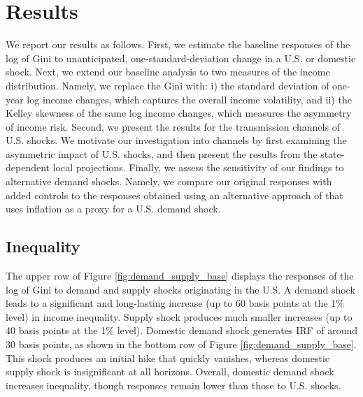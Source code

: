 \documentclass[12pt, a4paper]{article}
\begin{document}
\section{Results}
We report our results as follows. First, we estimate the baseline responses of the log of Gini to unanticipated, one-standard-deviation change in a U.S. or domestic shock. Next, we extend our baseline analysis to two measures of the income distribution. Namely, we replace the Gini with: i) the standard deviation of one-year log income changes, which captures the overall income volatility, and ii) the Kelley skewness of the same log income changes, which measures the asymmetry of income risk. Second, we present the results for the transmission channels of U.S. shocks. We motivate our investigation into channels by first examining the asymmetric impact of U.S. shocks, and then present the results from the state-dependent local projections. Finally, we assess the sensitivity of our findings to alternative demand shocks. Namely, we compare our original responses with added controls to the responses obtained using an alternative approach of \textcite{bayoumi1992shocking} that uses inflation as a proxy for a U.S. demand shock.


\subsection{Inequality}
The upper row of Figure \ref{fig:demand_supply_base} displays the responses of the log of Gini to demand and supply shocks originating in the U.S. A demand shock leads to a significant and long-lasting increase (up to 60 basis points at the 1\% level) in income inequality. Supply shock produces much smaller increases (up to 40 basis points at the 1\% level). Domestic demand shock generates IRF of around 30 basis points, as shown in the bottom row of Figure \ref{fig:demand_supply_base}. This shock produces an initial hike that quickly vanishes, whereas domestic supply shock is insignificant at all horizons. Overall, domestic demand shock increases inequality, though responses remain lower than those to U.S. shocks. 

\end{document}
